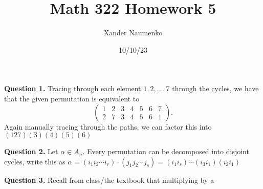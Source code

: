 \documentclass[letterpaper, reqno,11pt]{article}
\begin{document}
\title{Math 322 Homework 5}
\date{10/10/23}
\author{Xander Naumenko}
\maketitle

{\medskip\noindent\bf Question 1.} Tracing through each element $1,2,\ldots,7$ through the cycles, we have that the given permutation is equivalent to
\[
    \begin{pmatrix} 1&2&3&4&5&6&7\\2&7&3&4&5&6&1 \end{pmatrix} 
.\]
Again manually tracing through the paths, we can factor this into $(127)(3)(4)(5)(6)$

{\medskip\noindent\bf Question 2.} Let $\alpha\in A_n$. Every permutation can be decomposed into disjoint cycles, write this as $\alpha=(i_1i_2\cdots i_r)\cdot (j_1j_2\cdots j_s)=(i_1i_r)\cdots(i_3i_1)(i_2i_1)$

{\medskip\noindent\bf Question 3.} Recall from class/the textbook that multiplying by a 
\end{document}
